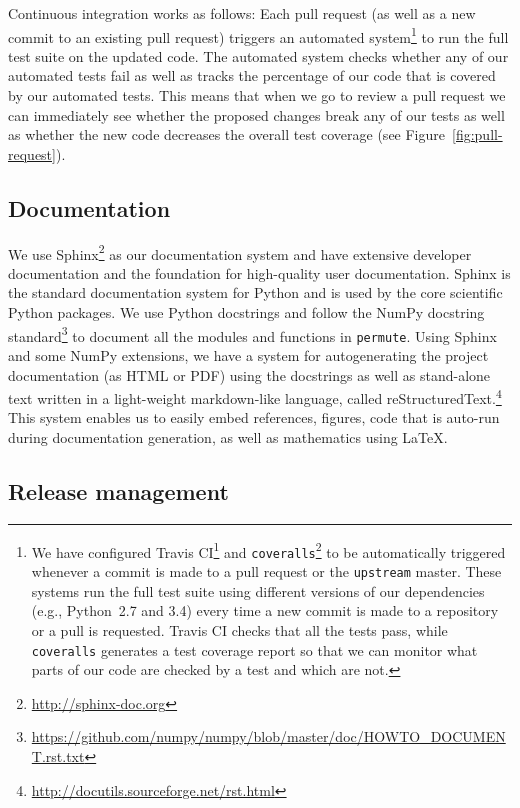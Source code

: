 \documentclass[]{article}
\begin{document}
Continuous integration works as follows:
Each pull request (as well as a new commit to an existing pull request) triggers
an automated system\footnote{
We have configured Travis CI\footnote{
  \url{https://travis-ci.org}
} 
and
\texttt{coveralls}\footnote{
  \url{https://coveralls.io}
}
to be automatically triggered whenever a commit is made to a pull request
or the \texttt{upstream} master.
These systems run the full test suite using different versions of our
dependencies (e.g., Python~2.7 and 3.4) every time a new commit is made to a
repository or a pull is requested.
Travis CI checks that all the tests pass, while \texttt{coveralls} generates a
test coverage report so that we can monitor what parts of our code are checked
by a test and which are not.
}
to run the full test suite on the updated code.
The automated system checks whether any of our automated tests fail as well
as tracks the percentage of our code that is covered by our automated tests.
This means that when we go to review a pull request we can immediately see
whether the proposed changes break any of our tests as well as whether the new
code decreases the overall test coverage (see Figure~\ref{fig:pull-request}).

\subsection{Documentation}

We use Sphinx\footnote{
   \url{http://sphinx-doc.org}
} 
as our documentation system
and have extensive developer documentation and the foundation for
high-quality user documentation.
Sphinx is the standard documentation system for Python and is used by
the core scientific Python packages.
We use Python docstrings and follow the NumPy docstring
standard\footnote{
   \url{https://github.com/numpy/numpy/blob/master/doc/HOWTO\_DOCUMENT.rst.txt}
}
to document all the modules and functions in \texttt{permute}.
Using Sphinx and some NumPy extensions, we have a system for autogenerating the
project documentation (as HTML or PDF) using the docstrings as well as
stand-alone text written in a light-weight markdown-like language, called
reStructuredText.\footnote{\url{http://docutils.sourceforge.net/rst.html}}
This system enables us to easily embed references, figures, code that is
auto-run during documentation generation, as well as mathematics using \LaTeX.

\subsection{Release management}
\end{document}
